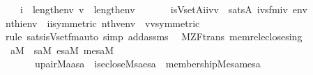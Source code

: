 \begin{isabellebody}
\ \ \ \ {\isachardoublequoteopen}i\ {\isacharless}{\kern0pt}\ length{\isacharparenleft}{\kern0pt}env{\isacharparenright}{\kern0pt}{\isachardoublequoteclose}\ {\isachardoublequoteopen}v\ {\isacharless}{\kern0pt}\ length{\isacharparenleft}{\kern0pt}env{\isacharparenright}{\kern0pt}{\isachardoublequoteclose}\isanewline
\ \ \isanewline
\ \ \ \ {\isachardoublequoteopen}is{\isacharunderscore}{\kern0pt}Vset{\isacharparenleft}{\kern0pt}{\isacharhash}{\kern0pt}{\isacharhash}{\kern0pt}A{\isacharcomma}{\kern0pt}ii{\isacharcomma}{\kern0pt}vv{\isacharparenright}{\kern0pt}\ {\isasymlongleftrightarrow}\ sats{\isacharparenleft}{\kern0pt}A{\isacharcomma}{\kern0pt}\ {\isacharquery}{\kern0pt}ivs{\isacharunderscore}{\kern0pt}fm{\isacharparenleft}{\kern0pt}i{\isacharcomma}{\kern0pt}v{\isacharparenright}{\kern0pt}{\isacharcomma}{\kern0pt}\ env{\isacharparenright}{\kern0pt}{\isachardoublequoteclose}\isanewline
%
\isadelimproof
\ \ %
\endisadelimproof
%
\isatagproof
{}\isamarkupfalse%
\ {\isacartoucheopen}nth{\isacharparenleft}{\kern0pt}i{\isacharcomma}{\kern0pt}env{\isacharparenright}{\kern0pt}\ {\isacharequal}{\kern0pt}\ ii{\isacartoucheclose}{\isacharbrackleft}{\kern0pt}symmetric{\isacharbrackright}{\kern0pt}\ {\isacartoucheopen}nth{\isacharparenleft}{\kern0pt}v{\isacharcomma}{\kern0pt}env{\isacharparenright}{\kern0pt}\ {\isacharequal}{\kern0pt}\ vv{\isacartoucheclose}{\isacharbrackleft}{\kern0pt}symmetric{\isacharbrackright}{\kern0pt}\isanewline
\ \ \isamarkupfalse%
\ {\isacharparenleft}{\kern0pt}rule\ sats{\isacharunderscore}{\kern0pt}is{\isacharunderscore}{\kern0pt}Vset{\isacharunderscore}{\kern0pt}fm{\isacharunderscore}{\kern0pt}auto{\isacharparenleft}{\kern0pt}{}{\isacharparenright}{\kern0pt}{\isacharsemicolon}{\kern0pt}\ simp\ add{\isacharcolon}{\kern0pt}assms{\isacharparenright}{\kern0pt}%
\endisatagproof
{\isafoldproof}%
%
\isadelimproof
\isanewline
%
\endisadelimproof
\isanewline
\isanewline
{}\isamarkupfalse%
\ {\isacharparenleft}{\kern0pt}\ M{\isacharunderscore}{\kern0pt}ZF{\isacharunderscore}{\kern0pt}trans{\isacharparenright}{\kern0pt}\ memrel{\isacharunderscore}{\kern0pt}eclose{\isacharunderscore}{\kern0pt}sing\ {\isacharcolon}{\kern0pt}\isanewline
\ \ {\isachardoublequoteopen}a{\isasymin}M\ {\isasymLongrightarrow}\ {\isasymexists}sa{\isasymin}M{\isachardot}{\kern0pt}\ {\isasymexists}esa{\isasymin}M{\isachardot}{\kern0pt}\ {\isasymexists}mesa{\isasymin}M{\isachardot}{\kern0pt}\isanewline
\ \ \ \ \ \ \ upair{\isacharparenleft}{\kern0pt}{\isacharhash}{\kern0pt}{\isacharhash}{\kern0pt}M{\isacharcomma}{\kern0pt}a{\isacharcomma}{\kern0pt}a{\isacharcomma}{\kern0pt}sa{\isacharparenright}{\kern0pt}\ {\isacharampersand}{\kern0pt}\ is{\isacharunderscore}{\kern0pt}eclose{\isacharparenleft}{\kern0pt}{\isacharhash}{\kern0pt}{\isacharhash}{\kern0pt}M{\isacharcomma}{\kern0pt}sa{\isacharcomma}{\kern0pt}esa{\isacharparenright}{\kern0pt}\ {\isacharampersand}{\kern0pt}\ membership{\isacharparenleft}{\kern0pt}{\isacharhash}{\kern0pt}{\isacharhash}{\kern0pt}M{\isacharcomma}{\kern0pt}esa{\isacharcomma}{\kern0pt}mesa{\isacharparenright}{\kern0pt}{\isachardoublequoteclose}\isanewline

\end{isabellebody}
